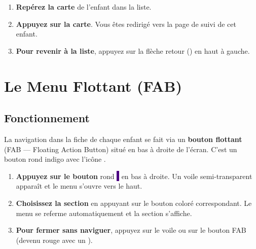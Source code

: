 \documentclass[12pt,a4paper]{report}
\newcommand{\fab}[1]{{\colorbox{indigo}{\small\sffamily\bfseries\color{white}\,#1\,}}}
\begin{document}
\begin{etape}[title=Proc\'edure : Acc\'eder au dossier d'un enfant]
\begin{enumerate}[leftmargin=1.5cm,label=\textbf{\arabic*.},itemsep=8pt]
  \item \textbf{Rep\'erez la carte} de l'enfant dans la liste.
  \item \textbf{Appuyez sur la carte}. Vous \^etes redirig\'e vers la page de suivi de cet enfant.
  \item \textbf{Pour revenir \`a la liste}, appuyez sur la fl\`eche retour (\faArrowLeft) en haut \`a gauche.
\end{enumerate}
\end{etape}

\newpage
\chapter{Le Menu Flottant (FAB)}

\section{Fonctionnement}

La navigation dans la fiche de chaque enfant se fait via un \textbf{bouton flottant} (FAB --- Floating Action Button) situ\'e en bas \`a droite de l'\'ecran. C'est un bouton rond indigo avec l'ic\^one \faTh.

\begin{etape}[title=Proc\'edure : Naviguer avec le menu flottant]
\begin{enumerate}[leftmargin=1.5cm,label=\textbf{\arabic*.},itemsep=10pt]
  \item \textbf{Appuyez sur le bouton} rond \fab{\faTh} en bas \`a droite. Un voile semi-transparent appara\^it et le menu s'ouvre vers le haut.

  \item \textbf{Choisissez la section} en appuyant sur le bouton color\'e correspondant. Le menu se referme automatiquement et la section s'affiche.

  \item \textbf{Pour fermer sans naviguer}, appuyez sur le voile ou sur le bouton FAB (devenu rouge avec un \faTimes).
\end{enumerate}
\end{etape}
\end{document}
